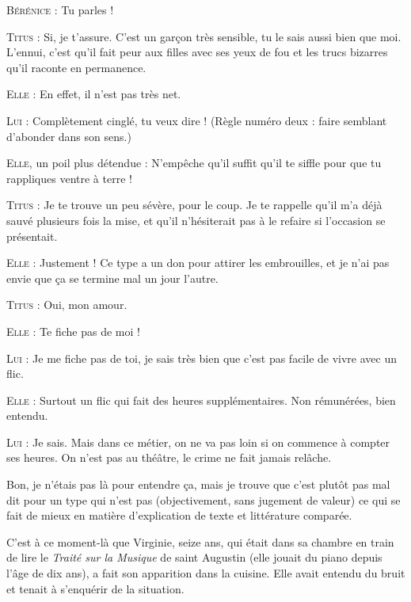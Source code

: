 \begin{dialogue}
\textsc{Bérénice} : Tu parles !

\textsc{Titus} : Si, je t’assure. C’est un garçon très sensible, tu le sais aussi bien que moi. L’ennui, c’est qu’il fait peur aux filles avec ses yeux de fou et les trucs bizarres qu’il raconte en permanence.

\textsc{Elle} : En effet, il n’est pas très net.

\textsc{Lui} : Complètement cinglé, tu veux dire ! (Règle numéro deux : faire semblant d’abonder dans son sens.)

\textsc{Elle}, un poil plus détendue : N’empêche qu’il suffit qu’il te siffle pour que tu rappliques ventre à terre !

\textsc{Titus} : Je te trouve un peu sévère, pour le coup. Je te rappelle qu’il m’a déjà sauvé plusieurs fois la mise, et qu’il n’hésiterait pas à le refaire si l’occasion se présentait.

\textsc{Elle} : Justement ! Ce type a un don pour attirer les embrouilles, et je n’ai pas envie que ça se termine mal un jour l’autre.

\textsc{Titus} : Oui, mon amour.

\textsc{Elle} : Te fiche pas de moi !

\textsc{Lui} : Je me fiche pas de toi, je sais très bien que c’est pas facile de vivre avec un flic.

\textsc{Elle} : Surtout un flic qui fait des heures supplémentaires. Non rémunérées, bien entendu.

\textsc{Lui} : Je sais. Mais dans ce métier, on ne va pas loin si on commence à compter ses heures. On n’est pas au théâtre, le crime ne fait jamais relâche.

\end{dialogue}

Bon, je n’étais pas là pour entendre ça, mais je trouve que c’est plutôt pas mal dit pour un type qui n’est pas (objectivement, sans jugement de valeur) ce qui se fait de mieux en matière d’explication de texte et littérature comparée.

C’est à ce moment-là que Virginie, seize ans, qui était dans sa chambre en train de lire le \textit{Traité sur la Musique} de saint Augustin (elle jouait du piano depuis l’âge de dix ans), a fait son apparition dans la cuisine. Elle avait entendu du bruit et tenait à s’enquérir de la situation.

